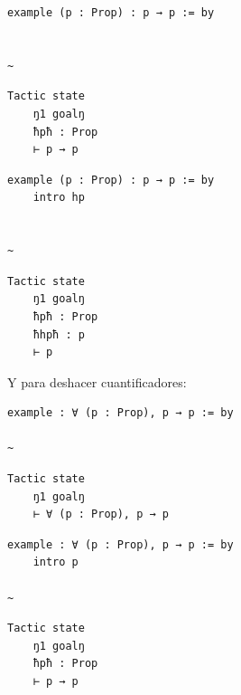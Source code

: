 \documentclass{article}
\begin{document}
\begin{minipage}[t]{0.58\textwidth}
\begin{lstlisting}[language=lean]
  example (p : Prop) : p → p := by


~
\end{lstlisting}
\end{minipage}%
\hfill
\begin{minipage}[t]{0.40\textwidth}
\begin{lstlisting}[language=infoview]
  Tactic state
    ŋ1 goalŋ
    ħpħ : Prop
    ⊢ p → p
\end{lstlisting}
\end{minipage}


\begin{minipage}[t]{0.58\textwidth}
\begin{lstlisting}[language=lean]
  example (p : Prop) : p → p := by
    intro hp


~
\end{lstlisting}
\end{minipage}%
\hfill
\begin{minipage}[t]{0.40\textwidth}
\begin{lstlisting}[language=infoview]
  Tactic state
    ŋ1 goalŋ
    ħpħ : Prop
    ħhpħ : p
    ⊢ p
\end{lstlisting}
\end{minipage}


Y para deshacer cuantificadores:

\begin{minipage}[t]{0.58\textwidth}
\begin{lstlisting}[language=lean]
  example : ∀ (p : Prop), p → p := by

~
\end{lstlisting}
\end{minipage}%
\hfill
\begin{minipage}[t]{0.40\textwidth}
\begin{lstlisting}[language=infoview]
  Tactic state
    ŋ1 goalŋ
    ⊢ ∀ (p : Prop), p → p
\end{lstlisting}
\end{minipage}


\begin{minipage}[t]{0.58\textwidth}
\begin{lstlisting}[language=lean]
  example : ∀ (p : Prop), p → p := by
    intro p

~
\end{lstlisting}
\end{minipage}%
\hfill
\begin{minipage}[t]{0.40\textwidth}
\begin{lstlisting}[language=infoview]
  Tactic state
    ŋ1 goalŋ
    ħpħ : Prop
    ⊢ p → p
\end{lstlisting}
\end{minipage}
\end{document}
